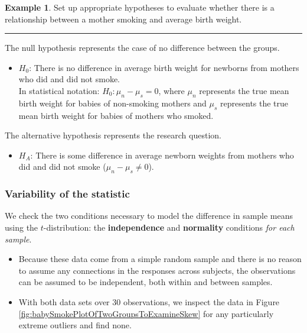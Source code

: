 \documentclass[
  10pt,
  openany]{book}
\providecommand{\tightlist}{%
  \setlength{\itemsep}{0pt}\setlength{\parskip}{0pt}}
\theoremstyle{definition}
\theoremstyle{definition}
\newtheorem{example}{Example}[chapter]
\theoremstyle{definition}
\theoremstyle{definition}
\theoremstyle{remark}
\begin{document}
\begin{example}

Set up appropriate hypotheses to evaluate
whether there is a relationship between a mother smoking
and average birth weight.

\begin{center}\rule{0.5\linewidth}{0.5pt}\end{center}

The null hypothesis represents the case of no difference
between the groups.

\begin{itemize}
\tightlist
\item
  \(H_0\): There is no difference in average birth weight for
  newborns from mothers who did and did not smoke.\\
  In statistical notation: \(H_0: \mu_{n} - \mu_{s} = 0\),
  where \(\mu_{n}\) represents the true mean birth weight for babies of non-smoking mothers and
  \(\mu_s\) represents the true mean birth weight for babies of mothers who smoked.
\end{itemize}

The alternative hypothesis represents the research question.

\begin{itemize}
\tightlist
\item
  \(H_A\): There is some difference in average newborn weights
  from mothers who did and did not smoke (\(\mu_{n} - \mu_{s} \neq 0\)).
\end{itemize}

\end{example}

\subsubsection*{Variability of the statistic}\label{variability-of-the-statistic-9}

We check the two conditions necessary to model the difference
in sample means using the \(t\)-distribution: the \textbf{independence} and \textbf{normality} conditions \emph{for each sample}.

\begin{itemize}
\tightlist
\item
  Because these data come from a simple random sample and there is no reason to assume any connections in the responses across subjects,
  the observations can be assumed to be independent,
  both within and between samples.\\
\item
  With both data sets over 30 observations,
  we inspect the data in
  Figure \ref{fig:babySmokePlotOfTwoGroupsToExamineSkew}
  for any particularly extreme outliers
  and find none.
\end{itemize}
\end{document}
